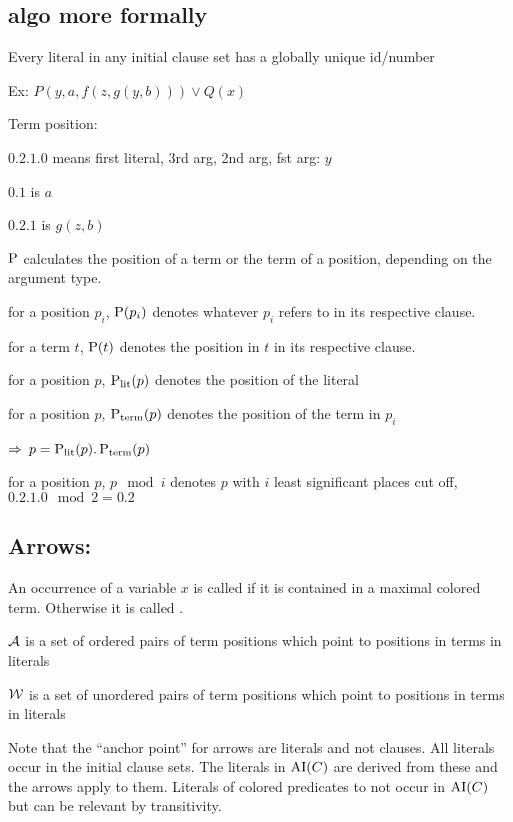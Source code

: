 \documentclass[,%
	paper=a4,%
	DIV12, %
	twoside=false,%
	liststotoc,
	bibtotoc,
	draft=false,%
	numbers=noendperiod
]{scrartcl}
\begin{document}
\clearpage
\subsection{algo more formally}

Every literal in any initial clause set has a globally unique id/number

Ex: $P(y, a, f(z, g(y, b)) ) \lor Q(x)$

Term position:

$0.2.1.0$ means first literal, 3rd arg, 2nd arg, fst arg: $y$

$0.1$ is $a$

$0.2.1$ is $g(z, b)$

$\operatorname{{\operatorname P}}$ calculates the position of a term or the term of a position, depending on the argument type.

for a position $p_i$, $\operatorname{{\operatorname P}}(p_i)$ denotes whatever $p_i$ refers to in its respective clause.

for a term $t$, $\operatorname{{\operatorname P}}(t)$ denotes the position in $t$ in its respective clause.

for a position $p$, $\operatorname{\operatorname{{\operatorname P}}_\mathrm{lit}}(p)$ denotes the position of the literal

for a position $p$, $\operatorname{\operatorname{{\operatorname P}}_\mathrm{term}}(p)$ denotes the position of the term in $p_i$ 

$\Rightarrow$ $p = \operatorname{\operatorname{{\operatorname P}}_\mathrm{lit}}(p).\operatorname{\operatorname{{\operatorname P}}_\mathrm{term}}(p)$

for a position $p$, $p \mod i$ denotes $p$ with $i$ least significant places cut off, $0.2.1.0 \mod 2 = 0.2$

\subsection{Arrows:}

\begin{defi}
	An occurrence of a variable $x$ is called  if it is contained in a maximal colored term.
	Otherwise it is called .
\end{defi}

$\operatorname{\mathcal{A}}$ is a set of ordered pairs of term positions which point to positions in terms in literals

$\operatorname{\mathcal{W}}$ is a set of unordered pairs of term positions which point to positions in terms in literals

Note that the ``anchor point'' for arrows are literals and not clauses.
All literals occur in the initial clause sets.
The literals in $\operatorname{AI}(C)$ are derived from these and the arrows apply to them.
Literals of colored predicates to not occur in $\operatorname{AI}(C)$ but can be relevant by transitivity.
\end{document}
